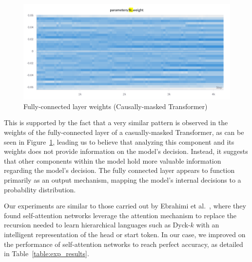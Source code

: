 \begin{figure}[ht!]
    \centering
    \includegraphics[width=0.7\linewidth]{docs/figs/fc_weights_causal.png}
    \caption{Fully-connected layer weights (Causally-masked Transformer)}
    \label{fig:causal-fc-weights}
\end{figure}

This is supported by the fact that a very similar pattern is observed in the weights of the fully-connected layer of a casually-masked Transformer, as can be seen in Figure~\ref{fig:causal-fc-weights}, leading us to believe that analyzing this component and its weights does not provide information on the model's decision. Instead, it suggests that other components within the model hold more valuable information regarding the model's decision. The fully connected layer appears to function primarily as an output mechanism, mapping the model's internal decisions to a probability distribution.

Our experiments are similar to those carried out by Ebrahimi et al.~\cite{sa-nets-dyck-n}, where they found self-attention networks leverage the attention mechanism to replace the recursion needed to learn hierarchical languages such as Dyck-$k$ with an intelligent representation of the head or start token. In our case, we improved on the performance of self-attention networks to reach perfect accuracy, as detailed in Table~\ref{table:exp_results}. 





